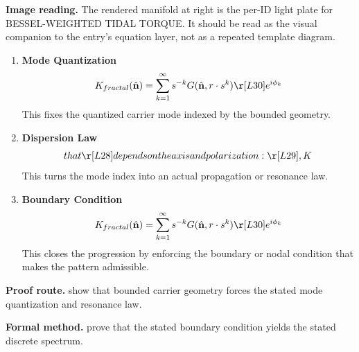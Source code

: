 \begin{samepage}
\noindent\begin{minipage}[t]{0.45\linewidth}
\vspace{0pt}
\raggedright
\scriptsize\textbf{Image reading.} The rendered manifold at right is the per-ID light plate for BESSEL-WEIGHTED TIDAL TORQUE. It should be read as the visual companion to the entry's equation layer, not as a repeated template diagram.\par
\end{minipage}\hfill
\begin{minipage}[t]{0.53\linewidth}
\vspace*{-0.10in}
\raggedright
{}
\end{minipage}
\end{samepage}

\clearpage


\begin{enumerate}[leftmargin=1.6em,itemsep=9pt,topsep=6pt]
\item \textbf{Mode Quantization}
\[
K_{fractal}(\hat{\mathbf{n}}) = \sum_{k=1}^{\infty} s^{-k} G(\hat{\mathbf{n}}, r \cdot s^k)\r [L30] e^{i\phi_k}
\]
This fixes the quantized carrier mode indexed by the bounded geometry.

\item \textbf{Dispersion Law}
\[
that\r [L28] depends on the axis and polarization:\r [L29],K
\]
This turns the mode index into an actual propagation or resonance law.

\item \textbf{Boundary Condition}
\[
K_{fractal}(\hat{\mathbf{n}}) = \sum_{k=1}^{\infty} s^{-k} G(\hat{\mathbf{n}}, r \cdot s^k)\r [L30] e^{i\phi_k}
\]
This closes the progression by enforcing the boundary or nodal condition that makes the pattern admissible.
\end{enumerate}

\textbf{Proof route.} show that bounded carrier geometry forces the stated mode quantization and resonance law.

\textbf{Formal method.} prove that the stated boundary condition yields the stated discrete spectrum.

\medskip
{}


